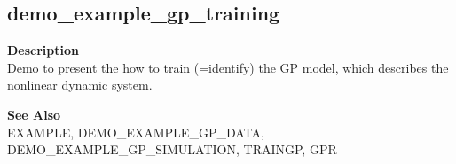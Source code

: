 \subsection*{demo\_example\_gp\_training} \label{fun:demo_example_gp_training}

\textbf{Description}
\\ Demo to present the how to train (=identify) the GP model, which
 describes the nonlinear dynamic system.

\textbf{See Also}
\\ EXAMPLE, DEMO\_EXAMPLE\_GP\_DATA, DEMO\_EXAMPLE\_GP\_SIMULATION, TRAINGP, GPR
